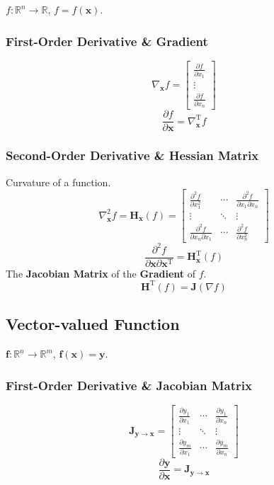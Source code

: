 \documentclass{article}
\begin{document}
$f: \mathbb{R}^n \to \mathbb{R}$, $f = f(\mathbf{x})$.

\subsubsection{First-Order Derivative \& Gradient}
\[
    \nabla_\mathbf{x} f =
    \begin{bmatrix}
        \frac{\partial f}{\partial x_1} \\
        \vdots \\
        \frac{\partial f}{\partial x_n}
    \end{bmatrix}
\]
\[
    \frac{\partial f}{\partial \mathbf{x}} = \nabla_\mathbf{x}^{\mathrm{T}} f
\]

\subsubsection{Second-Order Derivative \& Hessian Matrix}
Curvature of a function.
\[
    \nabla^2_\mathbf{x} f = \mathbf{H}_\mathbf{x}(f) =
    \begin{bmatrix}
        \frac{\partial^2 f}{\partial x_1^2} & \cdots & \frac{\partial^2 f}{\partial x_1 \partial x_n} \\
        \vdots & \ddots & \vdots \\
        \frac{\partial^2 f}{\partial x_n \partial x_1} & \cdots & \frac{\partial^2 f}{\partial x_n^2}
    \end{bmatrix}
\]
\[
    \frac{\partial^2 f}{\partial \mathbf{x} \partial \mathbf{x}^{\mathrm{T}}} = \mathbf{H}_\mathbf{x}^{\mathrm{T}}(f)
\]
The \textbf{Jacobian Matrix} of the \textbf{Gradient} of $f$.
\[
    \mathbf{H}^{\mathrm{T}}(f) = \mathbf{J}(\nabla f)
\]

\subsection{Vector-valued Function}

$\mathbf{f}: \mathbb{R}^n \to \mathbb{R}^m$, $\mathbf{f}(\mathbf{x}) = \mathbf{y}$.

\subsubsection{First-Order Derivative \& Jacobian Matrix}
\[
    \mathbf{J_{\mathbf{y} \to \mathbf{x}}} =
    \begin{bmatrix}
        \frac{\partial y_1}{\partial x_1} & \cdots & \frac{\partial y_1}{\partial x_n} \\
        \vdots & \ddots & \vdots \\
        \frac{\partial y_m}{\partial x_1} & \cdots & \frac{\partial y_m}{\partial x_n}
    \end{bmatrix}
\]
\[
    \frac{\partial \mathbf{y}}{\partial \mathbf{x}} = \mathbf{J_{\mathbf{y} \to \mathbf{x}}}
\]
\end{document}
